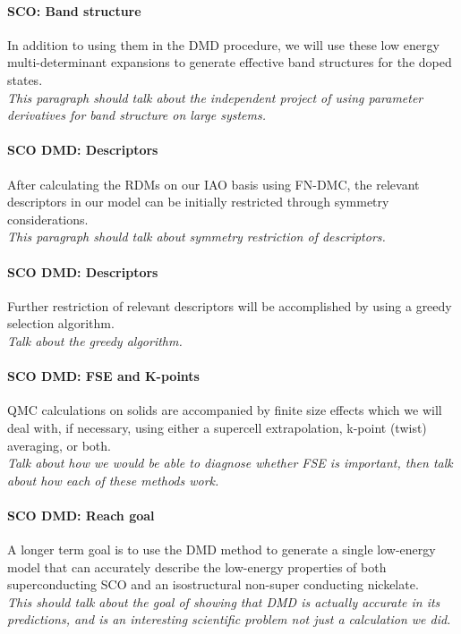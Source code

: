 \documentclass{article}
\begin{document}
\paragraph{SCO: Band structure} In addition to using them in the DMD procedure, we will use these low energy multi-determinant expansions to generate effective band structures for the doped states.
\\
\textit{This paragraph should talk about the independent project of using parameter derivatives for band structure on large systems.}

\paragraph{SCO DMD: Descriptors} After calculating the RDMs on our IAO basis using FN-DMC, the relevant descriptors in our model can be initially restricted through symmetry considerations.
\\
\textit{This paragraph should talk about symmetry restriction of descriptors.}

\paragraph{SCO DMD: Descriptors} Further restriction of relevant descriptors will be accomplished by using a greedy selection algorithm.
\\
\textit{Talk about the greedy algorithm.}

\paragraph{SCO DMD:  FSE and K-points} QMC calculations on solids are accompanied by finite size effects which we will deal with, if necessary, using either a supercell extrapolation, k-point (twist) averaging, or both.
\\
\textit{Talk about how we would be able to diagnose whether FSE is important, then talk about how each of these methods work.}
 
 \paragraph{SCO DMD: Reach goal} A longer term goal is to use the DMD method to generate a single low-energy model that can accurately describe the low-energy properties of both superconducting SCO and an isostructural non-super conducting nickelate.
 \\
 \textit{This should talk about the goal of showing that DMD is actually accurate in its predictions, and is an interesting scientific problem not just a calculation we did.}
\end{document}
